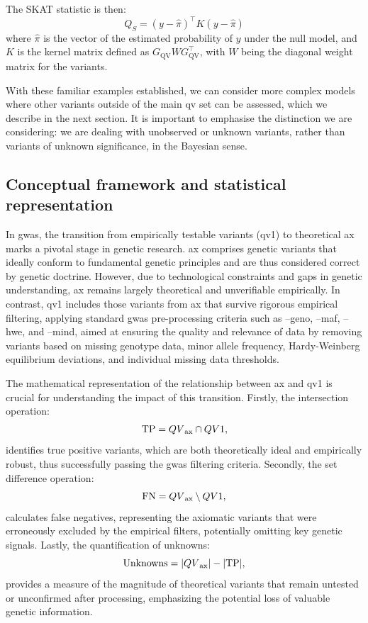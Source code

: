 The SKAT statistic is then:
$$
Q_S = (y - \hat{\pi})^\top K (y - \hat{\pi})
$$
where \( \hat{\pi} \) is the vector of the estimated probability of \( y \) under the null model, and \( K \) is the kernel matrix defined as \( G_{\text{QV}} W G_{\text{QV}}^\top \), with \( W \) being the diagonal weight matrix for the variants.

With these familiar examples established, we can consider more complex models where other variants outside of the main \ac{qv} set can be assessed, which we describe in the next section. 
It is important to emphasise the distinction we are considering: we are dealing with unobserved or unknown variants, rather than variants of unknown significance, in the Bayesian sense.

\subsection{Conceptual framework and statistical representation}

In \ac{gwas}, the transition from empirically testable variants (\ac{qv}1) to theoretical \ac{ax} marks a pivotal stage in genetic research.
\ac{ax} comprises genetic variants that ideally conform to fundamental genetic principles and are thus considered correct by genetic doctrine. 
However, due to technological constraints and gaps in genetic understanding, \ac{ax} remains largely theoretical and unverifiable empirically. 
In contrast, \ac{qv}1 includes those variants from \ac{ax} that survive rigorous empirical filtering, applying standard \ac{gwas} pre-processing criteria such as --geno, --maf, --hwe, and --mind, aimed at ensuring the quality and relevance of data by removing variants based on missing genotype data, minor allele frequency, Hardy-Weinberg equilibrium deviations, and individual missing data thresholds.

The mathematical representation of the relationship between \ac{ax} and \ac{qv}1 is crucial for understanding the impact of this transition. Firstly, the intersection operation:
$$
\text{TP} = QV\textsubscript{ax} \cap QV1,
$$
identifies true positive variants, which are both theoretically ideal and empirically robust, thus successfully passing the \ac{gwas} filtering criteria.
 Secondly, the set difference operation:
$$
\text{FN} = QV\textsubscript{ax} \setminus QV1,
$$
calculates false negatives, representing the axiomatic variants that were erroneously excluded by the empirical filters, potentially omitting key genetic signals. 
Lastly, the quantification of unknowns:
$$
\text{Unknowns} = |QV\textsubscript{ax}| - |\text{TP}|,
$$
provides a measure of the magnitude of theoretical variants that remain untested or unconfirmed after processing, emphasizing the potential loss of valuable genetic information.

